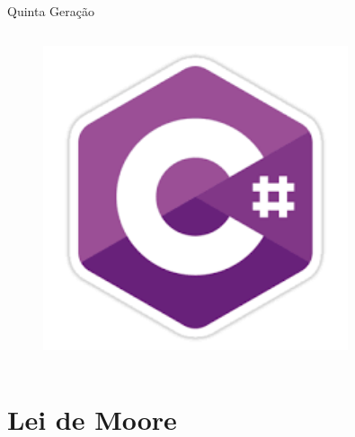 \documentclass[aspectratio=169,
				xcolor=table]{beamer}
\begin{document}
\begin{frame}{Quinta Geração}
\begin{columns}
\begin{column}{0.23\textwidth}
				\begin{figure}
					\centering
					\includegraphics[width=0.8\textwidth, keepaspectratio]{../figs/cap03/linguagemcs} 			
				\end{figure}
			\end{column}
		\end{columns}
	\end{frame}		
	
	\section{Lei de Moore}
		
\end{document}
